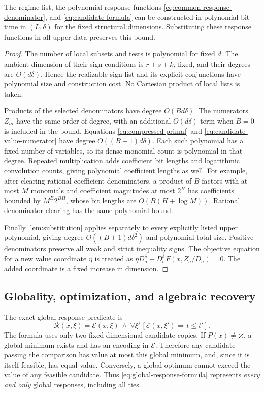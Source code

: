 \begin{lemma}\label{lem:candidate-size}
The regime list, the polynomial response functions
\eqref{eq:common-response-denominator}, and \eqref{eq:candidate-formula}
can be constructed in polynomial bit time in $(L,\delta)$ for the fixed
structural dimensions. Substituting these response functions in all
upper data preserves this bound.
\end{lemma}
\begin{proof}
The number of local subsets and tests is polynomial for fixed $d$.
The ambient dimension of their sign conditions is $r+s+k$, fixed, and
their degrees are $O(d\delta)$. Hence the realizable sign list and its
explicit conjunctions have polynomial size and construction cost. No
Cartesian product of local lists is taken.

Products of the selected denominators have degree $O(Bd\delta)$.
The numerators $Z_{i\sigma}$ have the same order of degree, with an
additional $O(d\delta)$ term when $B=0$ is included in the bound.
Equations \eqref{eq:compressed-primal} and
\eqref{eq:candidate-value-numerator} have degree $O((B+1)d\delta)$.
Each such polynomial has a fixed number of variables, so its dense
monomial count is polynomial in that degree. Repeated multiplication
adds coefficient bit lengths and logarithmic convolution counts, giving
polynomial coefficient lengths as well. For example, after clearing
rational coefficient denominators, a product of $B$ factors with at most
$M$ monomials and coefficient magnitudes at most $2^H$ has coefficients
bounded by $M^B2^{BH}$, whose bit lengths are $O(B(H+\log M))$.
Rational denominator clearing has the same polynomial bound.

Finally \cref{lem:substitution} applies separately to every explicitly
listed upper polynomial, giving degree $O((B+1)d\delta^2)$ and
polynomial total size. Positive denominators preserve all weak and
strict inequality signs. The objective equation for a new value
coordinate $\eta$ is treated as
$\eta D_\sigma^\delta-D_\sigma^\delta F(x,Z_\sigma/D_\sigma)=0$.
The added coordinate is a fixed increase in dimension.
\end{proof}

\subsection{Globality, optimization, and algebraic recovery}\label{subsec:global-comparison}

The exact global-response predicate is
\begin{equation}\label{eq:global-response-formula}
 \mathcal R(x,\xi)=\mathcal E(x,\xi)\ \wedge\
 \forall\xi'\,[\mathcal E(x,\xi')\Longrightarrow t\le t'].
\end{equation}
The formula uses only two fixed-dimensional candidate copies. If
$P(x)\ne\varnothing$, a global minimum exists and has an encoding in
$\mathcal E$. Therefore any candidate passing the comparison has value
at most this global minimum, and, since it is itself feasible, has equal
value. Conversely, a global optimum cannot exceed the value of any
feasible candidate. Thus \eqref{eq:global-response-formula} represents
\emph{every and only} global responses, including all ties.

